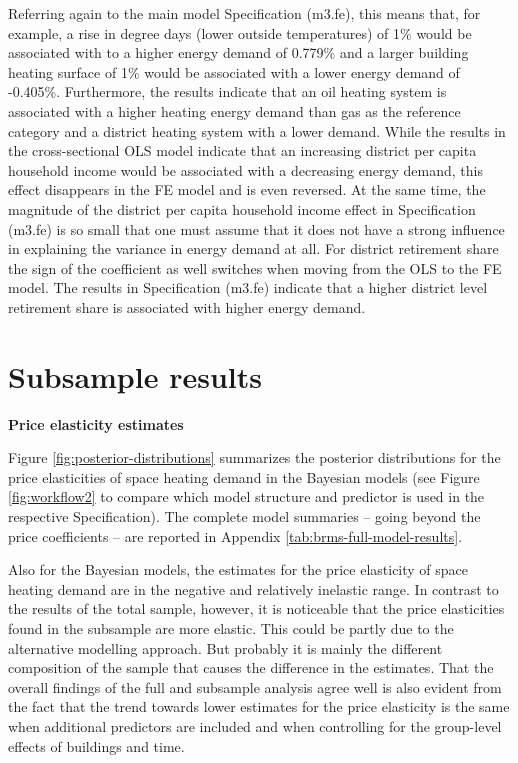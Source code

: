 \documentclass[12pt,twoside]{reedthesis}
\begin{document}
Referring again to the main model Specification (m3.fe), this means that, for example, a rise in degree days (lower outside temperatures) of 1\% would be associated with to a higher energy demand of 0.779\% and a larger building heating surface of 1\% would be associated with a lower energy demand of -0.405\%. Furthermore, the results indicate that an oil heating system is associated with a higher heating energy demand than gas as the reference category and a district heating system with a lower demand. While the results in the cross-sectional OLS model indicate that an increasing district per capita household income would be associated with a decreasing energy demand, this effect disappears in the FE model and is even reversed. At the same time, the magnitude of the district per capita household income effect in Specification (m3.fe) is so small that one must assume that it does not have a strong influence in explaining the variance in energy demand at all. For district retirement share the sign of the coefficient as well switches when moving from the OLS to the FE model. The results in Specification (m3.fe) indicate that a higher district level retirement share is associated with higher energy demand.

\hypertarget{subsample_results}{%
\section{Subsample results}\label{subsample_results}}

\textbf{Price elasticity estimates}

Figure \ref{fig:posterior-distributions} summarizes the posterior distributions for the price elasticities of space heating demand in the Bayesian models (see Figure \ref{fig:workflow2} to compare which model structure and predictor is used in the respective Specification). The complete model summaries -- going beyond the price coefficients -- are reported in Appendix \ref{tab:brms-full-model-results}.

Also for the Bayesian models, the estimates for the price elasticity of space heating demand are in the negative and relatively inelastic range. In contrast to the results of the total sample, however, it is noticeable that the price elasticities found in the subsample are more elastic. This could be partly due to the alternative modelling approach. But probably it is mainly the different composition of the sample that causes the difference in the estimates. That the overall findings of the full and subsample analysis agree well is also evident from the fact that the trend towards lower estimates for the price elasticity is the same when additional predictors are included and when controlling for the group-level effects of buildings and time.
\end{document}
